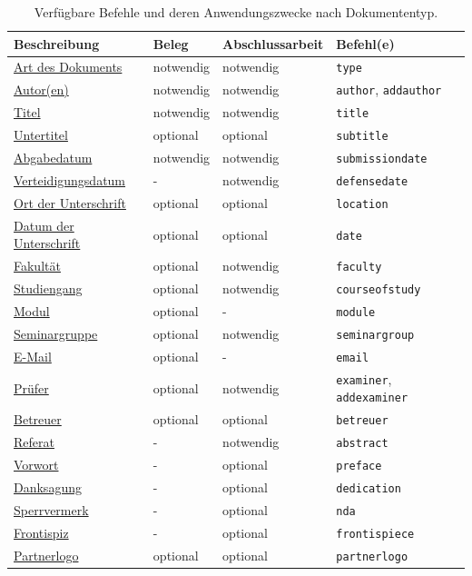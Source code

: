 	\begin{table}[!htb]
		\def\yes{notwendig}
		\def\no{-}
		\def\maybe{optional}
		
		\centering
		\caption{Verfügbare Befehle und deren Anwendungszwecke nach Dokumententyp.}
		\label{tab:macros}
		\begin{tabular}{llll}
			\toprule
			\textbf{Beschreibung} & \textbf{Beleg} & \textbf{Abschlussarbeit} & \textbf{Befehl(e)} \\
			\midrule
\hyperref[cmd:type]{Art des Dokuments} & \yes & \yes & \texttt{type} \\
			\hyperref[cmd:author]{Autor(en)} & \yes & \yes & \texttt{author}, \texttt{addauthor} \\
			\hyperref[cmd:title]{Titel} & \yes & \yes & \texttt{title} \\
			\hyperref[cmd:subtitle]{Untertitel} & \maybe & \maybe & \texttt{subtitle} \\
			\hyperref[cmd:submissiondate]{Abgabedatum} & \yes & \yes & \texttt{submissiondate} \\
			\hyperref[cmd:defensedate]{Verteidigungsdatum} & \no & \yes & \texttt{defensedate} \\
			\hyperref[cmd:location]{Ort der Unterschrift} & \maybe & \maybe & \texttt{location} \\
			\hyperref[cmd:date]{Datum der Unterschrift} & \maybe & \maybe & \texttt{date} \\
			\hyperref[cmd:faculty]{Fakultät} & \maybe & \yes & \texttt{faculty} \\
			\hyperref[cmd:courseofstudy]{Studiengang} & \maybe & \yes & \texttt{courseofstudy} \\
			\hyperref[cmd:module]{Modul} & \maybe & \no & \texttt{module} \\
			\hyperref[cmd:seminargroup]{Seminargruppe} & \maybe & \yes & \texttt{seminargroup} \\
			\hyperref[cmd:email]{E-Mail} & \maybe & \no & \texttt{email} \\
\hyperref[cmd:examiner]{Prüfer} & \maybe & \yes & \texttt{examiner}, \texttt{addexaminer} \\
\hyperref[cmd:betreuer]{Betreuer} & \maybe & \maybe & \texttt{betreuer} \\
			\hyperref[cmd:abstract]{Referat} & \no & \yes & \texttt{abstract} \\
			\hyperref[cmd:preface]{Vorwort} & \no & \maybe & \texttt{preface} \\
			\hyperref[cmd:dedication]{Danksagung} & \no & \maybe & \texttt{dedication} \\
			\hyperref[cmd:nda]{Sperrvermerk} & \no & \maybe & \texttt{nda} \\
			\hyperref[cmd:frontispiece]{Frontispiz} & \no & \maybe & \texttt{frontispiece} \\
			\hyperref[cmd:partnerlogo]{Partnerlogo} & \maybe & \maybe & \texttt{partnerlogo} \\
			\bottomrule
		\end{tabular}
	\end{table}
	
